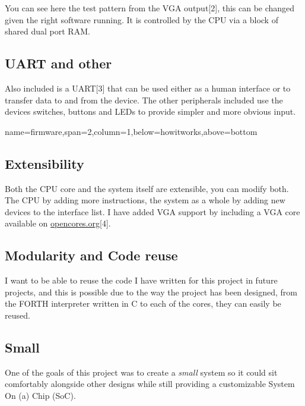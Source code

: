 \documentclass[a1paper,portrait]{baposter}
\begin{document}
\begin{poster}
{You can see here the test pattern from the VGA output[2], this can be changed
given the right software running. It is controlled by the CPU via a block of
shared dual port RAM.

\subsection{UART and other}

Also included is a UART[3] that can be used either as a human interface or to transfer
data to and from the device. The other peripherals included use the devices switches,
buttons and LEDs to provide simpler and more obvious input.
}
{name=firmware,span=2,column=1,below=howitworks,above=bottom}{
\scriptsize
\subsection{Extensibility}
Both the CPU core and the system itself are extensible, you can modify both. The CPU by adding
more instructions, the system as a whole by adding new devices to the interface list. I have
added VGA support by including a VGA core available on \url{opencores.org}[4].
\subsection{Modularity and Code reuse}
I want to be able to reuse the code I have written for this project in future projects, and
this is possible due to the way the project has been designed, from the FORTH interpreter
written in C to each of the cores, they can easily be reused.
\subsection{Small}
One of the goals of this project was to create a \emph{small} system so it could sit
comfortably alongside other designs while still providing a customizable System On (a)
Chip (SoC).
}

\end{poster}
\end{document}
